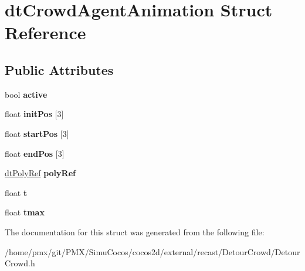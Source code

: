 \hypertarget{structdtCrowdAgentAnimation}{}\section{dt\+Crowd\+Agent\+Animation Struct Reference}
\label{structdtCrowdAgentAnimation}
\subsection*{Public Attributes}
\begin{DoxyCompactItemize}
\item 
\mbox{\label{structdtCrowdAgentAnimation_a063331d0a657ca1e138dde68ad6375f4}} 
bool {\bfseries active}
\item 
\mbox{\label{structdtCrowdAgentAnimation_a15201224a3852a5c6366fb20a2387017}} 
float {\bfseries init\+Pos} \mbox{[}3\mbox{]}
\item 
\mbox{\label{structdtCrowdAgentAnimation_ac3b06e0ed0a92d492b649e139f93c478}} 
float {\bfseries start\+Pos} \mbox{[}3\mbox{]}
\item 
\mbox{\label{structdtCrowdAgentAnimation_a36f2405e5b10749c416cb05e80ae4cf9}} 
float {\bfseries end\+Pos} \mbox{[}3\mbox{]}
\item 
\mbox{\label{structdtCrowdAgentAnimation_a84a98c95db9bc9db2f334311430669ac}} 
\hyperlink{group__detour_gab4e0b2257a670c1a800057999612b466}{dt\+Poly\+Ref} {\bfseries poly\+Ref}
\item 
\mbox{\label{structdtCrowdAgentAnimation_a96b279c54ccfe7d77cc576edbff7298e}} 
float {\bfseries t}
\item 
\mbox{\label{structdtCrowdAgentAnimation_a6895f4df2e560189e66fac03ca02e2ba}} 
float {\bfseries tmax}
\end{DoxyCompactItemize}


The documentation for this struct was generated from the following file\+:\begin{DoxyCompactItemize}
\item 
/home/pmx/git/\+P\+M\+X/\+Simu\+Cocos/cocos2d/external/recast/\+Detour\+Crowd/Detour\+Crowd.\+h\end{DoxyCompactItemize}
